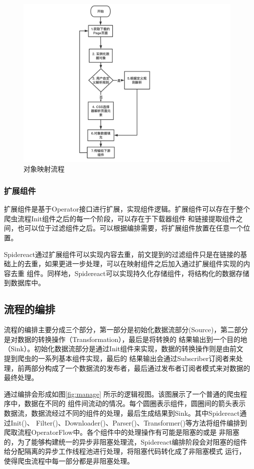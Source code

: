 \documentclass[master]{njuthesis}
\begin{document}
\begin{figure}
\centering
\includegraphics[width=1.2\textwidth]{pic/reflect.png}
\caption{对象映射流程}\label{fig:reflect}
\end{figure}

\subsubsection{扩展组件}
扩展组件是基于Operator接口进行扩展，实现组件逻辑。扩展组件可以存在于整个爬虫流程Init组件之后的每一个阶段，可以存在于下载器组件
和链接提取组件之间，也可以位于过滤组件之后。可以根据编排需要，将扩展组件放置在任意一个位置。

Spidereact通过扩展组件可以实现内容去重，前文提到的过滤组件只是在链接的基础上的去重，如果更进一步处理，可以在映射组件之后加入通过扩展组件实现的内容去重
组件。同样地，Spidereact可以实现持久化存储组件，将结构化的数据存储到数据库中。


\subsection{流程的编排}

流程的编排主要分成三个部分，第一部分是初始化数据流部分(Source)，第二部分是对数据的转换操作（Transformation），最后是将转换的
结果输出到一个目的地（Sink）。初始化数据流部分是通过Init组件来实现，数据的转换操作则是由前文提到爬虫的一系列基本组件实现，最后的
结果输出会通过Subscriber订阅者来处理，前两部分构成了一个数据流的发布者，最后通过发布者订阅者模式来对数据的最终处理。

通过编排会形成如图\ref{fig:manage} 所示的逻辑视图。该图展示了一个普通的爬虫程序中，数据在不同的
组件间流动的情况。每个圆圈表示组件，圆圈间的箭头表示数据流，数据流经过不同的组件的处理，最后生成结果到Sink。其中Spidereact通过Init()、
Filter()、Downloader()、Parser()、Transformer()等方法将组件编排到爬取流程OperatorFlow中。各个组件中的处理操作有可能是阻塞的或是
非阻塞的，为了能够构建统一的异步非阻塞处理流，Spidereact编排阶段会对阻塞的组件给分配隔离的异步工作线程池进行处理，将阻塞代码转化成了非阻塞模式
运行，使得爬虫流程中每一部分都是非阻塞处理。
\end{document}
